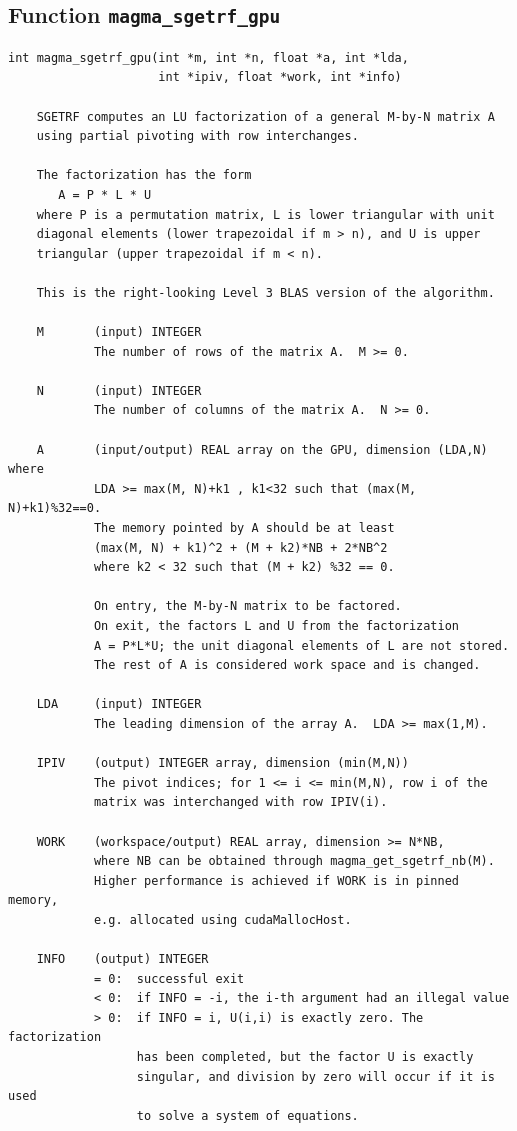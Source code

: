 \documentclass[10pt]{book}
\begin{document}
\newpage
\subsection{Function {\tt {\bf magma\_sgetrf\_gpu}}}
\begin{verbatim}
int magma_sgetrf_gpu(int *m, int *n, float *a, int *lda, 
                     int *ipiv, float *work, int *info)
   
    SGETRF computes an LU factorization of a general M-by-N matrix A   
    using partial pivoting with row interchanges.   

    The factorization has the form   
       A = P * L * U   
    where P is a permutation matrix, L is lower triangular with unit   
    diagonal elements (lower trapezoidal if m > n), and U is upper   
    triangular (upper trapezoidal if m < n).   

    This is the right-looking Level 3 BLAS version of the algorithm.   

    M       (input) INTEGER   
            The number of rows of the matrix A.  M >= 0.   

    N       (input) INTEGER   
            The number of columns of the matrix A.  N >= 0.   

    A       (input/output) REAL array on the GPU, dimension (LDA,N) where
            LDA >= max(M, N)+k1 , k1<32 such that (max(M, N)+k1)%32==0.
            The memory pointed by A should be at least 
            (max(M, N) + k1)^2 + (M + k2)*NB + 2*NB^2
            where k2 < 32 such that (M + k2) %32 == 0.
                 
            On entry, the M-by-N matrix to be factored.   
            On exit, the factors L and U from the factorization   
            A = P*L*U; the unit diagonal elements of L are not stored.   
            The rest of A is considered work space and is changed.

    LDA     (input) INTEGER   
            The leading dimension of the array A.  LDA >= max(1,M).   

    IPIV    (output) INTEGER array, dimension (min(M,N))   
            The pivot indices; for 1 <= i <= min(M,N), row i of the   
            matrix was interchanged with row IPIV(i).   

    WORK    (workspace/output) REAL array, dimension >= N*NB,
            where NB can be obtained through magma_get_sgetrf_nb(M).
            Higher performance is achieved if WORK is in pinned memory, 
            e.g. allocated using cudaMallocHost.

    INFO    (output) INTEGER   
            = 0:  successful exit   
            < 0:  if INFO = -i, the i-th argument had an illegal value   
            > 0:  if INFO = i, U(i,i) is exactly zero. The factorization   
                  has been completed, but the factor U is exactly   
                  singular, and division by zero will occur if it is used   
                  to solve a system of equations.   
\end{verbatim}
\end{document}
